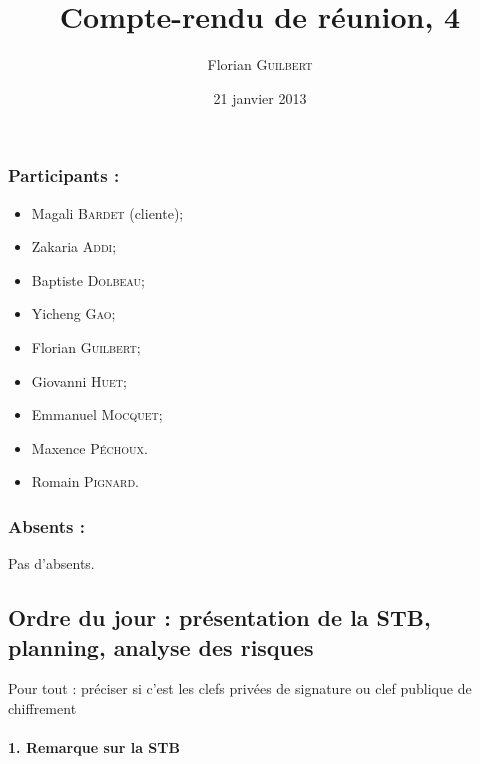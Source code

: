 \documentclass[a4paper,10pt]{article}
\author{Florian \textsc{Guilbert}}
\title{Compte-rendu de réunion, 4}
\date{21 janvier 2013}
\begin{document}
\maketitle

\subsubsection*{Participants : }
\begin{itemize}
    \item Magali \textsc{Bardet} (cliente);
    \item Zakaria \textsc{Addi};
    \item Baptiste \textsc{Dolbeau};
    \item Yicheng \textsc{Gao};
    \item Florian \textsc{Guilbert};
    \item Giovanni \textsc{Huet};
    \item Emmanuel \textsc{Mocquet};
    \item Maxence  \textsc{Péchoux}.
    \item Romain \textsc{Pignard}.
\end{itemize}

\subsubsection*{Absents : }
Pas d'absents.

\subsection*{Ordre du jour : présentation de la STB, planning, analyse 
des risques}

Pour tout :  préciser si c'est les clefs privées de signature ou clef publique
de chiffrement

\paragraph{1. Remarque sur la STB}
\end{document}
